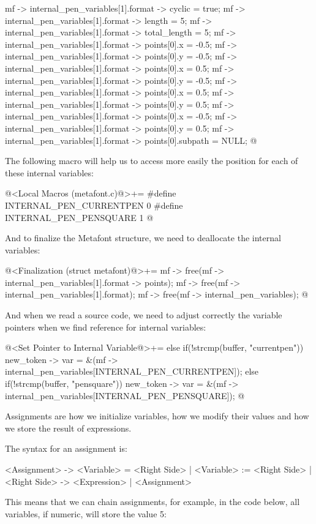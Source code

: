 mf -> internal_pen_variables[1].format -> cyclic = true;
mf -> internal_pen_variables[1].format -> length = 5;
mf -> internal_pen_variables[1].format -> total_length = 5;
mf -> internal_pen_variables[1].format -> points[0].x = -0.5;
mf -> internal_pen_variables[1].format -> points[0].y = -0.5;
mf -> internal_pen_variables[1].format -> points[0].x = 0.5;
mf -> internal_pen_variables[1].format -> points[0].y = -0.5;
mf -> internal_pen_variables[1].format -> points[0].x = 0.5;
mf -> internal_pen_variables[1].format -> points[0].y = 0.5;
mf -> internal_pen_variables[1].format -> points[0].x = -0.5;
mf -> internal_pen_variables[1].format -> points[0].y = 0.5;
mf -> internal_pen_variables[1].format -> points[0].subpath = NULL;
@
\fimcodigo

The following macro will help us to access more easily the position
for each of these internal variables:

\iniciocodigo
@<Local Macros (metafont.c)@>+=
#define INTERNAL_PEN_CURRENTPEN 0
#define INTERNAL_PEN_PENSQUARE  1
@
\fimcodigo

And to finalize the Metafont structure, we need to deallocate the
internal variables:

\iniciocodigo
@<Finalization (struct metafont)@>+=
mf -> free(mf -> internal_pen_variables[1].format -> points);
mf -> free(mf -> internal_pen_variables[1].format);
mf -> free(mf -> internal_pen_variables);
@
\fimcodigo

And when we read a source code, we need to adjust correctly the
variable pointers when we find reference for internal variables:


\iniciocodigo
@<Set Pointer to Internal Variable@>+=
else if(!strcmp(buffer, "currentpen"))
  new_token -> var =
          &(mf -> internal_pen_variables[INTERNAL_PEN_CURRENTPEN]);
else if(!strcmp(buffer, "pensquare"))
  new_token -> var =
          &(mf -> internal_pen_variables[INTERNAL_PEN_PENSQUARE]);
@
\fimcodigo


Assignments are how we initialize variables, how we modify their
values and how we store the result of expressions.

The syntax for an assignment is:

\alinhaverbatim
<Assignment> -> <Variable> = <Right Side> |
                <Variable> := <Right Side> |
<Right Side> -> <Expression> | <Assignment>
\alinhanormal

This means that we can chain assignments, for example, in the code
below, all variables, if numeric, will store the value 5:

